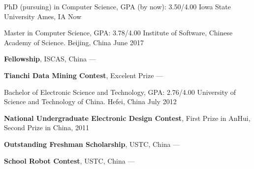 
\begin{cventries}

  \cventry
    {PhD (pursuing) in Computer Science, GPA (by now): 3.50/4.00} %
    {Iowa State University} %
    {Ames, IA} %
    {Now} %
    {}

  \cventry
    {Master in Computer Science, GPA: 3.78/4.00} %
    {Institute of Software, Chinese Academy of Science.} %
    {Beijing, China} %
    {June 2017} %
    {
      \begin{cvitems} %
         \item {\textbf{Fellowship}, ISCAS, China --- }
         \vspace{0.5mm}
         \item {\textbf{Tianchi Data Mining Contest}, Excelent Prize --- }
      \end{cvitems}
    }

  \cventry
    {Bachelor of Electronic Science and Technology, GPA: 2.76/4.00}
    {University of Science and Technology of China.}
    {Hefei, China}
    {July 2012}
    {
      \begin{cvitems}
        \item {\textbf{National Undergraduate Electronic Design Contest}, First Prize in AnHui, Second Prize in China, 2011}
        \vspace{0.5mm}
        \item {\textbf{Outstanding Freshman Scholarship}, USTC, China --- }
        \vspace{0.5mm}
        \item {\textbf{School Robot Contest}, USTC, China --- }
        \vspace{0.5mm}
      \end{cvitems}
    }
\end{cventries}
